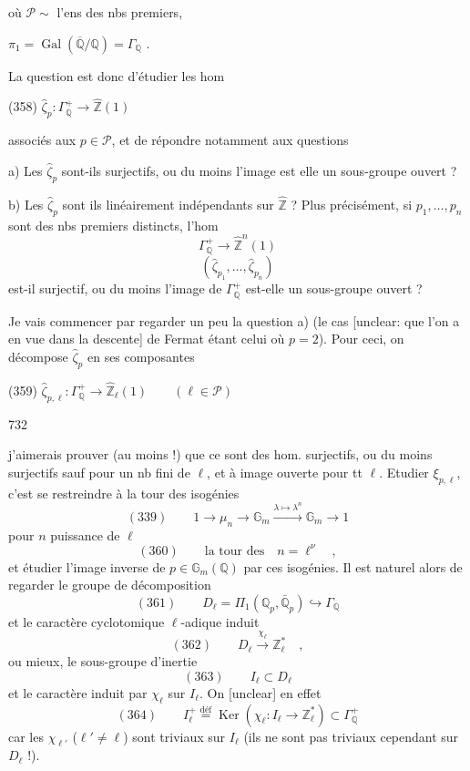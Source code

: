où $\mathcal{P} \sim$ l'ens des nbs premiers,

$\pi_1 = \operatorname{Gal}(\overline{\mathbb{Q}}/\mathbb{Q}) = \Gamma_{\mathbb{Q}}$ .

La question est donc d'étudier les hom

(358) $\hat{\zeta}_p : \Gamma_{\mathbb{Q}}^+ \to \hat{\mathbb{Z}}(1)$

associés aux $p \in \mathcal{P}$, et de répondre notamment
aux questions

a) Les $\hat{\zeta}_p$ sont-ils surjectifs, ou du moins l'image est elle un sous-groupe ouvert ?

b) Les $\hat{\zeta}_p$ sont ils linéairement indépendants sur $\hat{\mathbb{Z}}$ ? Plus précisément, si $p_1, \dots, p_n$ sont des nbs premiers distincts, l'hom
$$ \Gamma_{\mathbb{Q}}^+ \to \hat{\mathbb{Z}}^n(1) $$
$$ (\hat{\zeta}_{p_1}, \dots, \hat{\zeta}_{p_n}) $$
est-il surjectif, ou du moins l'image de $\Gamma_{\mathbb{Q}}^+$ est-elle un sous-groupe ouvert ?

Je vais commencer par regarder un peu la question a) (le cas [unclear: que l'on a en vue dans la descente] de Fermat étant celui où $p=2$). Pour ceci, on décompose $\hat{\zeta}_p$ en ses composantes

(359) $\hat{\zeta}_{p, \ell} : \Gamma_{\mathbb{Q}}^+ \to \hat{\mathbb{Z}}_{\ell}(1) \qquad (\ell \in \mathcal{P})$

\newpage


732

j'aimerais prouver (au moins !) que ce sont
des hom. surjectifs, ou du moins surjectifs
sauf pour un nb fini de $\ell$, et à image
ouverte pour tt $\ell$. Etudier $\xi_{p,\ell}$, c'est
se restreindre à la tour des isogénies
$$ (339) \qquad 1 \to \mu_n \to \mathbb{G}_m \xrightarrow{\lambda \mapsto \lambda^n} \mathbb{G}_m \to 1 $$
pour $n$ puissance de $\ell$
$$ (360) \qquad \text{la tour des} \quad n=\ell^\nu \quad , $$
et étudier l'image inverse de $p \in \mathbb{G}_m(\mathbb{Q})$
par ces isogénies. Il est naturel alors
de regarder le groupe de décomposition
$$ (361) \qquad D_\ell = \Pi_1(\mathbb{Q}_p, \bar{\mathbb{Q}}_p) \hookrightarrow \Gamma_\mathbb{Q} $$
et le caractère cyclotomique $\ell$-adique induit
$$ (362) \qquad D_\ell \xrightarrow{\chi_\ell} \mathbb{Z}_\ell^\ast \quad , $$
ou mieux, le sous-groupe d'inertie
$$ (363) \qquad I_\ell \subset D_\ell $$
et le caractère induit par $\chi_\ell$ sur $I_\ell$.
On [unclear] en effet
$$ (364) \qquad I_\ell^+ \overset{\text{déf}}{=} \operatorname{Ker}(\chi_\ell : I_\ell \to \mathbb{Z}_\ell^\ast) \subset \Gamma_\mathbb{Q}^+ $$
car les $\chi_{\ell'}$ ($\ell' \neq \ell$) sont triviaux sur $I_\ell$
(ils ne sont pas triviaux cependant sur $D_\ell$ !).


